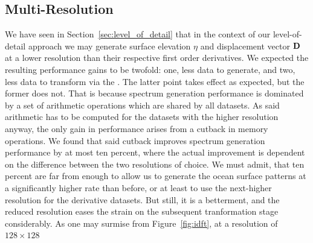 

%
%
\subsection{Multi-Resolution}
We have seen in Section~\ref{sec:level_of_detail} that in the context of our
level-of-detail approach we may generate surface elevation $\eta$ and
displacement vector $\mathbf{D}$ at a lower resolution than their respective
first order derivatives. We expected the resulting performance gains to be twofold: one,
less data to generate, and two, less data to transform via the \IDFT.
The latter point takes effect as expected, but the former does not.
That is because spectrum generation performance is dominated by a set of
arithmetic operations which are shared by all datasets. As said
arithmetic has to be computed for the datasets with the higher resolution
anyway, the only gain in performance arises from a cutback in memory operations.
We found that said cutback improves spectrum generation performance by at most
ten percent, where the actual improvement is dependent on the difference between
the two resolutions of choice. We must admit, that ten percent are far from
enough to allow us to generate the ocean surface patterns at a significantly
higher rate than before, or at least to use the next-higher resolution for the
derivative datasets. But still, it is a betterment, and the reduced resolution
eases the strain on the subsequent tranformation stage considerably.
As one may surmise from Figure~\ref{fig:idft}, at a resolution of $128\times128$
